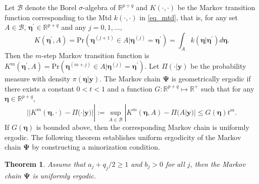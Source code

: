 \documentclass[11pt,a4paper]{article}
\newtheorem{theorem}{Theorem}
\begin{document}
Let $\mathscr{B}$ denote the Borel $\sigma$-algebra of $\mathbb{R}^{p+q}$ and
$K(\cdot,\cdot)$ be the Markov transition function corresponding to the Mtd
$k(\cdot, \cdot)$ in \eqref{eq_mtd}, that is, for any set
$A \in \mathscr{B}$, $\bm{\eta}^{\prime} \in \mathbb{R}^{p+q}$ and any
$j=0,1,\dots,$
\begin{equation}
\label{eq:def}
K(\bm{\eta}^{\prime}, A) = \mbox{Pr}(\bm{\eta}^{(j+1)} \in A | \bm{\eta}^{(j)} = \bm{\eta}^{\prime}) = \int_{A} k(\bm{\eta}| \bm{\eta}^\prime) d\bm{\eta}.
\end{equation}
Then the $m$-step Markov transition function is $K^m(\bm{\eta}^{\prime}, A) = \mbox{Pr}(\bm{\eta}^{(m+j)} \in A | \bm{\eta}^{(j)} = \bm{\eta}^{\prime})$. Let $\Pi(\cdot|\bm{y})$ be the probability measure with density
$\pi(\bm{\eta}|\bm{y})$. The Markov chain $\bm{\Psi}$ is geometrically ergodic if
there exists a constant $0 < t <1$ and a function
$G: \mathbb{R}^{p+q} \mapsto \mathbb{R}^+$ such that for any
$\bm{\eta} \in \mathbb{R}^{p+q}$,
\begin{equation}
\label{eq:ge}
||K^m(\bm{\eta},\cdot) - \Pi(\cdot|\bm{y})||:=\sup_{A\in \mathscr{B}} |K^m(\bm{\eta}, A) - \Pi(A|\bm{y})| \leq G(\bm{\eta}) t^m.
\end{equation}
If $G(\bm{\eta})$ is bounded above, then the corresponding Markov chain is uniformly ergodic. The following theorem establishes uniform ergodicity of the Markov chain $\bm{\Psi}$ by constructing a minorization condition. 



\begin{theorem}
\label{them}
Assume that $a_j + q_j/2 \geq 1$ and $b_j >0$ for all $j$, then the Markov chain $\bm{\Psi}$ is uniformly ergodic.
\end{theorem}
\end{document}
